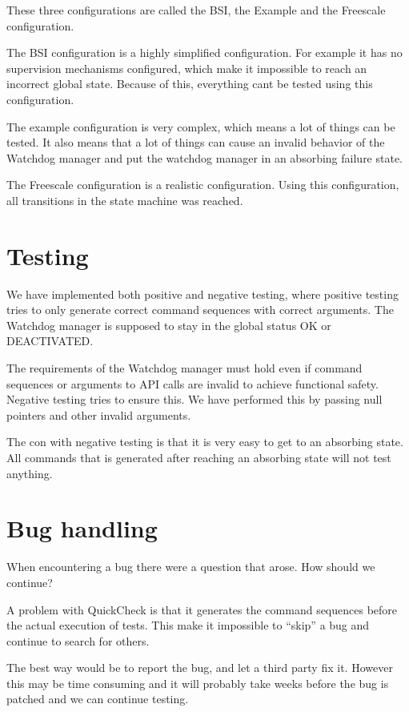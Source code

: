 \documentclass[a4paper]{article}
\begin{document}
These three configurations are called the BSI, the Example and the
Freescale configuration.

The BSI configuration is a highly simplified configuration. For
example it has no supervision mechanisms configured, which make it
impossible to reach an incorrect global state.
Because of this, everything cant be tested using this configuration.

The example configuration is very complex, which means a lot of things
can be tested. It also means that a lot of things can cause an invalid
behavior of the Watchdog manager and put the watchdog manager in an
absorbing failure state.

The Freescale configuration is a realistic configuration.
Using this configuration, all transitions in the state machine was reached.

\section{Testing}
We have implemented both positive and negative testing, where positive
testing tries to only generate correct command sequences with correct
arguments. The Watchdog manager is supposed to stay in the global
status OK or DEACTIVATED.

The requirements of the Watchdog manager must hold even if command
sequences or arguments to API calls are invalid to achieve functional
safety. Negative testing tries to ensure this. We have performed this
by passing null pointers and other invalid arguments.

The con with negative testing is that it is very easy to get to an
absorbing state. All commands that is generated after reaching an
absorbing state will not test anything.

\section{Bug handling}
When encountering a bug there were a question that arose. How should
we continue?

A problem with QuickCheck is that it generates the command sequences
before the actual execution of tests. This make it impossible to
``skip'' a bug and continue to search for others.

The best way would be to report the bug, and let a third party fix
it. However this may be time consuming and it will probably take weeks
before the bug is patched and we can continue testing.
\end{document}
